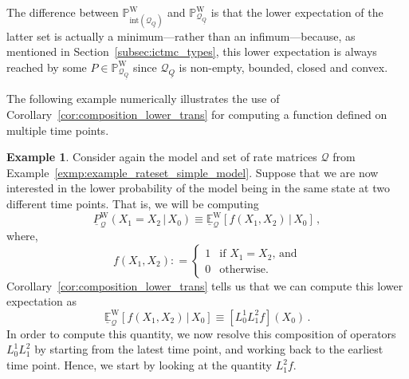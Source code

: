\documentclass[10pt,a4paper]{paper}
\theoremstyle{definition}
\newtheorem{exmp}{Example}%
\newcommand{\processes}{\mathbb{P}}
\newcommand{\wprocesses}{\processes^{\mathrm{W}}}
\newcommand{\rateset}{\mathcal{Q}}
\newcommand{\lrate}{\underline{Q}}
\newcommand{\coloneqq}{:\!=}
\begin{document}
The difference between $\wprocesses_{\text{int}(\rateset_{\lrate})}$ and $\wprocesses_{\rateset_{\lrate}}$ is that the lower expectation of the latter set is actually a minimum---rather than an infimum---because, as mentioned in Section~\ref{subsec:ictmc_types}, this lower expectation is always reached by some $P\in\wprocesses_{\rateset_{\lrate}}$ since $\rateset_{\lrate}$ is non-empty, bounded, closed and convex.


The following example numerically illustrates the use of Corollary~\ref{cor:composition_lower_trans} for computing a function defined on multiple time points.

\begin{exmp}\label{exmp:num_multivar_func_nonmarkov}
Consider again the model and set of rate matrices $\rateset$ from Example~\ref{exmp:example_rateset_simple_model}. Suppose that we are now interested in the lower probability of the model being in the same state at two different time points. That is, we will be computing
\begin{equation*}
\underline{P}_{\rateset}^{\mathrm{W}}(X_1 = X_2\,\vert\, X_0) \equiv \underline{\mathbb{E}}_{\rateset}^{\mathrm{W}}[f(X_1,X_2)\,\vert\,X_0]\,,
\end{equation*}
where,
\begin{equation*}
f(X_1,X_2) \coloneqq \left\{\begin{array}{ll}
1 & \text{if $X_1 = X_2$, and} \\
0 & \text{otherwise.}
\end{array}\right.
\end{equation*}
Corollary~\ref{cor:composition_lower_trans} tells us that we can compute this lower expectation as
\begin{equation}\label{eq:num_example_composition}
\underline{\mathbb{E}}_{\rateset}^\mathrm{W}[f(X_1,X_2)\,\vert\,X_0] \equiv \left[L_0^1L_1^2f\right](X_0)\,.
\end{equation}
In order to compute this quantity, we now resolve this composition of operators $L_0^1L_1^2$ by starting from the latest time point, and working back to the earliest time point. Hence, we start by looking at the quantity $L_1^2f$. 


\end{exmp}
\end{document}
